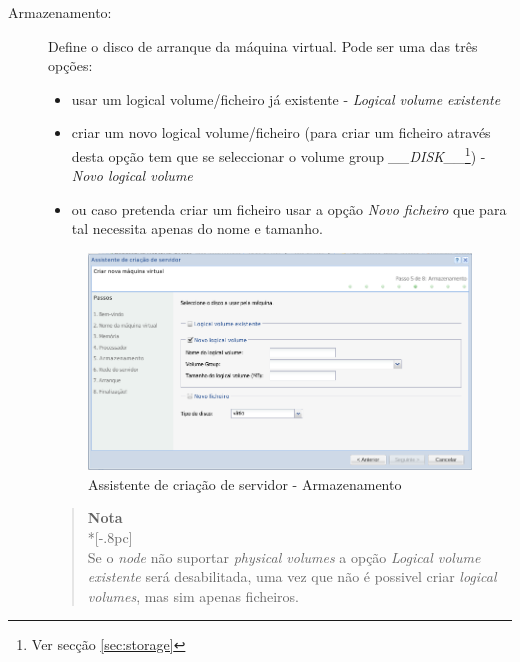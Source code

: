 \begin{description}
	\item[Armazenamento:] Define o disco de arranque da máquina virtual. Pode ser uma das três opções:
\begin{itemize}
	\item usar um logical volume/ficheiro já existente - \emph{Logical volume existente}
	\item criar um novo logical volume/ficheiro (para criar um ficheiro através desta opção tem que se seleccionar o volume group \emph{\_\_DISK\_\_}\footnote{Ver secção \ref{sec:storage}}) - \emph{Novo logical volume}
	\item  ou caso pretenda criar um ficheiro usar a opção \emph{Novo ficheiro} que para tal necessita apenas do nome e tamanho.
\end{itemize}

        \begin{figure}[H]
        		\begin{center}
	        	\includegraphics[scale=0.5]{screenshots/server_createwiz_storage.png}
	        	\caption{Assistente de criação de servidor - Armazenamento}
		        \label{fig:server_createwiz_storage}
        		\end{center}
		\end{figure}

		\begin{quote}
			{\large \bf Nota} \\*[-.8pc]
			\underline{\hspace{6in}} \\
			Se o \emph{node} não suportar \emph{physical volumes} a opção \emph{Logical volume existente} será desabilitada, uma vez que não é possivel criar \emph{logical volumes}, mas sim apenas ficheiros.
		\end{quote}		
        

\end{description}
